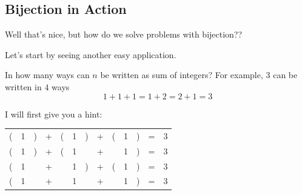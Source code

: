 \documentclass[compress]{beamer}
\begin{document}
\subsection{Bijection in Action}

\begin{frame}
    Well that's nice, but how do we solve problems with bijection??

    \pause\vspace{1em}

    Let's start by seeing another easy application.
\end{frame}

\begin{frame}
    \textcolor{NordOrange}{
        In how many ways can $n$ be written as sum of
        integers? For example, $3$ can be written in $4$ ways
        \[1 + 1+ 1 = 1+2 = 2 + 1 = 3\] 
    }

    \pause\vspace{1em}

    I will first give you a hint:

    \vspace{1em}

    \begin{center}
        \begin{tabular}{ccccccccccccc}
            ( & 1 & )& +  & ( & 1 & ) &+& ( & 1 & ) & = & 3\\
            ( & 1 & ) &+& ( & 1 & & +& & 1 & ) & = & 3\\
            ( & 1 &  & +& & 1 & ) &+ & ( & 1 & ) & = & 3\\
            ( & 1 &  & +& & 1 &  & +& & 1 & ) & = & 3\\
        \end{tabular}
    \end{center}
\end{frame}
\end{document}
